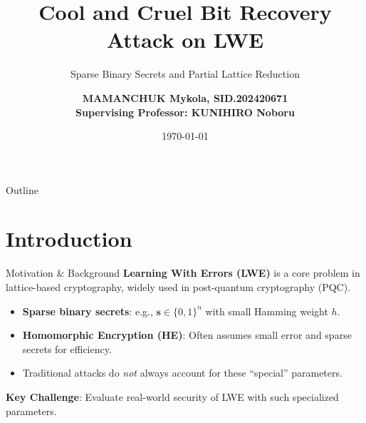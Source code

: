 \documentclass{beamer}
\title[CS Seminar / Hybrid Bit Recovery for LWE]{Cool and Cruel Bit Recovery Attack on LWE}
\subtitle{Sparse Binary Secrets and Partial Lattice Reduction}
\author[Mamanchuk Mykola]{\textbf{MAMANCHUK Mykola, SID.202420671} \\ \textbf{Supervising Professor: KUNIHIRO Noboru}}
\institute[UoT, CRISEC]{University of Tsukuba \\ Cryptography and Information Security Laboratory}
\date{\today}
\begin{document}
\begin{frame}
  \titlepage
\end{frame}

\begin{frame}{Outline}
  \tableofcontents
\end{frame}

\section{Introduction}
\begin{frame}{Motivation \& Background}
  \textbf{Learning With Errors (LWE)} is a core problem in lattice-based cryptography,
  widely used in post-quantum cryptography (PQC).

  \vspace{0.4cm}
  \begin{itemize}
    \item \textbf{Sparse binary secrets}: e.g., $\mathbf{s} \in \{0,1\}^n$ with small Hamming weight $h$.
    \item \textbf{Homomorphic Encryption (HE)}: Often assumes small error and sparse secrets for efficiency.
    \item Traditional attacks do \emph{not} always account for these ``special'' parameters.
  \end{itemize}

  \vspace{0.4cm}
  \textbf{Key Challenge}: Evaluate real-world security of LWE with such specialized parameters.
\end{frame}
\end{document}
